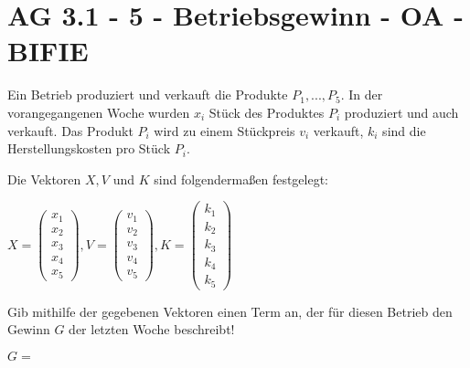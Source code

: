 \section{AG 3.1 - 5 - Betriebsgewinn - OA - BIFIE}

\begin{beispiel}[AG 3.1]{1} %
Ein Betrieb produziert und verkauft die Produkte $P_{1}, ..., P_{5}$. In der vorangegangenen Woche wurden $x_{i}$ Stück des Produktes $P_{i}$ produziert und auch verkauft. Das Produkt $P_{i}$ wird zu einem Stückpreis $v_{i}$ verkauft, $k_{i}$ sind die Herstellungskosten pro Stück $P_{i}$.

Die Vektoren $X,V$ und $K$ sind folgendermaßen festgelegt:
\leer

\begin{center}
$X=\left(\begin{array}{r}x_1\\x_2\\x_3\\x_4\\x_5\end{array}\right), V=\left(\begin{array}{r}v_1\\v_2\\v_3\\v_4\\v_5\end{array}\right), K=\left(\begin{array}{r}k_1\\k_2\\k_3\\k_4\\k_5\end{array}\right)$
\end{center}

Gib mithilfe der gegebenen Vektoren einen Term an, der für diesen Betrieb den Gewinn $G$ der letzten Woche beschreibt!
\leer

$G=$ 
\end{beispiel}